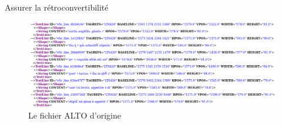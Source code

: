 \documentclass[11pt,aspectratio=169]{beamer}
\begin{document}
\begin{frame}{Assurer la rétroconvertibilité}
\begin{center}
\begin{figure}
\includegraphics[width=1\textwidth]{img/alto.png}
\caption{Le fichier ALTO d'origine}
\end{figure}
\end{center}
\end{frame}
\end{document}
